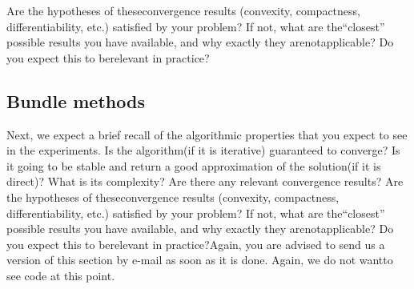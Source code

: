  
  Are the hypotheses of theseconvergence results (convexity, compactness, differentiability, etc.) satisfied by your problem? If not, what are the“closest” possible results you have available, and why exactly they arenotapplicable?  Do you expect this to berelevant in practice?

\subsection{Bundle methods}


Next, we expect a brief recall of the algorithmic properties that you expect to see in the experiments. Is the algorithm(if it is iterative) guaranteed to converge? Is it going to be stable and return a good approximation of the solution(if it is direct)? What is its complexity? Are there any relevant convergence results? Are the hypotheses of theseconvergence results (convexity, compactness, differentiability, etc.) satisfied by your problem? If not, what are the“closest” possible results you have available, and why exactly they arenotapplicable?  Do you expect this to berelevant in practice?Again, you are advised to send us a version of this section by e-mail as soon as it is done. Again, we do not wantto see code at this point.